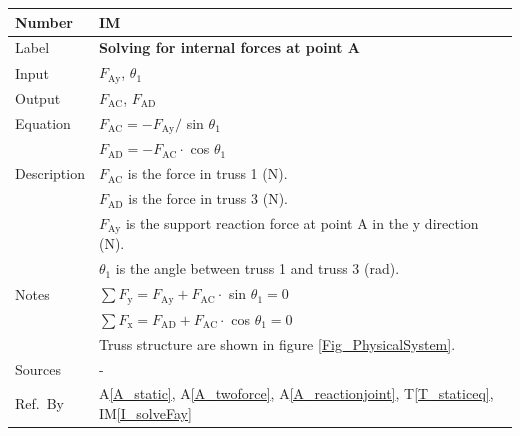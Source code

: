 \documentclass[12pt]{article}
\newcommand{\colAwidth}{0.13\textwidth}
\newcommand{\colBwidth}{0.82\textwidth}
\newcommand{\tref}[1]{T\ref{#1}}
\newcommand{\aref}[1]{A\ref{#1}}
\newcounter{instnum} %
\newcommand{\iref}[1]{IM\ref{#1}}
\begin{document}
\noindent
\begin{minipage}{\textwidth}
	\renewcommand*{\arraystretch}{1.5}
	\begin{tabular}{| p{\colAwidth} | p{\colBwidth}|}
		\hline
		\rowcolor[gray]{0.9}
		Number& IM{instnum}\theinstnum \label{I_solveA}\\
		\hline
		Label& \bf Solving for internal forces at point A\\
		\hline
		Input& $F_{\text{Ay}}$, $\theta_1$\\
		\hline
		Output& $F_{\text{{AC}}}$, $F_{\text{{AD}}}$ \\
		\hline
		Equation& $F_{\text{{AC}}} = -F_{\text{Ay}} /$ sin $\theta_1$ \\
		&$F_{\text{{AD}}} = -F_{\text{{AC}}} \cdot$ cos $\theta_1$ \\
		\hline
		Description&$F_{\text{{AC}}}$ is the force in truss 1 (N).\\
		&$F_{\text{{AD}}}$ is the force in truss 3 (N).\\
		&$F_{\text{Ay}}$ is the support reaction force at point A in the y 
		direction (N).\\		
		&$\theta_1$ is the angle between truss 1 and truss 3 (\si{\radian}).\\
		\hline
		Notes& $\sum F_{\text{y}} = F_{\text{Ay}} + F_{\text{{AC}}} \cdot$ sin 
		$\theta_1 = 0$\\
		&$\sum F_{\text{x}} = F_{\text{AD}} + F_{\text{{AC}}} \cdot$ cos 
		$\theta_1 = 0$\\
		&Truss structure are shown in figure \ref{Fig_PhysicalSystem}.\\
		\hline
		Sources& - \\
		\hline
		Ref.\ By & \aref{A_static}, \aref{A_twoforce}, \aref{A_reactionjoint}, 
		\tref{T_staticeq}, \iref{I_solveFay} \\
		\hline
	\end{tabular}
\end{minipage}\\

~\newline
\end{document}
